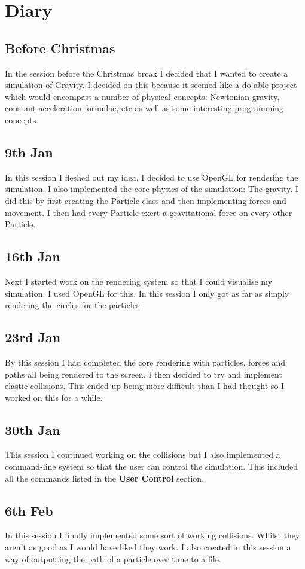 \section{Diary}
	\subsection{Before Christmas}
		In the session before the Christmas break I decided that I wanted to create a simulation of Gravity. I decided on this because it seemed like a do-able project which would encompass a number of physical concepts: Newtonian gravity, constant acceleration formulae, etc as well as some interesting programming concepts.
		
	\subsection{9th Jan}
		In this session I fleshed out my idea. I decided to use OpenGL for rendering the simulation. I also implemented the core physics of the simulation: The gravity. I did this by first creating the Particle class and then implementing forces and movement. I then had every Particle exert a gravitational force on every other Particle.
	
	\subsection{16th Jan}
		Next I started work on the rendering system so that I could visualise my simulation. I used OpenGL for this. In this session I only got as far as simply rendering the circles for the particles
		
	\subsection{23rd Jan}
		By this session I had completed the core rendering with particles, forces and paths all being rendered to the screen. I then decided to try and implement elastic collisions. This ended up being more difficult than I had thought so I worked on this for a while.
	
	\subsection{30th Jan}
		This session I continued working on the collisions but I also implemented a command-line system so that the user can control the simulation. This included all the commands listed in the \textbf{User Control} section.
	
	\subsection{6th Feb}
		In this session I finally implemented some sort of working collisions. Whilst they aren't as good as I would have liked they work. I also created in this session a way of outputting the path of a particle over time to a  file.